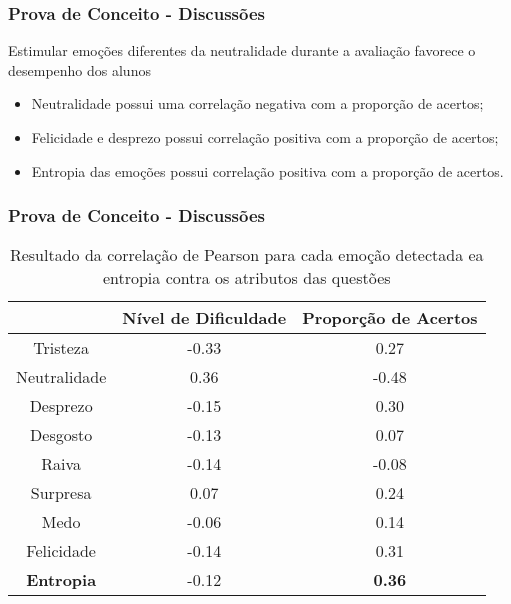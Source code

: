 \begin{frame}
\frametitle{Prova de Conceito - Discussões}
\begin{block}{Estimular emo\c{c}\~oes diferentes da neutralidade durante a avalia\c{c}\~ao favorece o desempenho dos alunos}
\begin{itemize}
\item Neutralidade possui uma correla\c{c}\~ao negativa com a propor\c{c}\~ao de acertos;
\item Felicidade e desprezo possui correla\c{c}\~ao positiva com a propor\c{c}\~ao de acertos;
\pause
\item Entropia das emo\c{c}\~oes possui correla\c{c}\~ao positiva com a propor\c{c}\~ao de acertos.
\end{itemize}
\end{block}

\end{frame}

\begin{frame}
\frametitle{Prova de Conceito - Discussões}
\begin{table}[]\footnotesize
\centering
\caption{Resultado​ ​da​ ​correla\c{c}\~ao​ ​de​ ​Pearson​ ​para​ ​cada​ ​emo\c{c}\~ao​ ​detectada
e​ ​a​ ​entropia​ ​contra​ ​os​ ​atributos​ ​das​ ​quest\~oes}
\label{my-label}
\begin{tabular}{|c|c|c|}
\hline
                      & \textbf{Nível de Dificuldade} & \textbf{Proporção de Acertos} \\ \hline
Tristeza	     & -0.33                & 0.27                          \\ \hline
Neutralidade & 0.36                 & -0.48                \\ \hline
Desprezo     		& -0.15                         & 0.30                 \\ \hline
Desgosto              & -0.13                         & 0.07                          \\ \hline
Raiva                 & -0.14                         & -0.08                         \\ \hline
Surpresa              & 0.07                          & 0.24                          \\ \hline
Medo                  & -0.06                         & 0.14                          \\ \hline
Felicidade   		& -0.14                         & 0.31                 \\ \hline
\small \textbf{Entropia}     		& -0.12                         & \small \textbf{0.36}                 \\ \hline
\end{tabular}
\end{table}
\end{frame}

